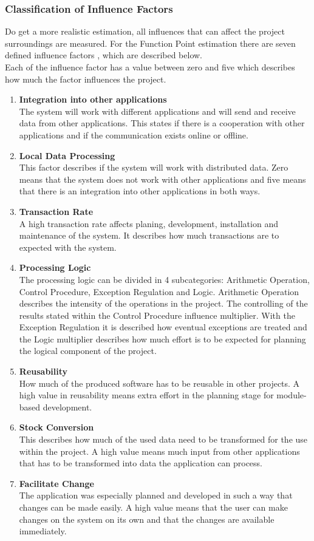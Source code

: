 \subsubsection{ Classification of Influence Factors}

Do get a more realistic estimation, all influences that can affect the project surroundings are measured. For the Function Point estimation there are seven defined influence factors \cite{Softwaremanagement}, which are described below.\\
Each of the influence factor has a value between zero and five which describes how much the factor influences the project.\\

\begin{enumerate}
	\item \textbf{Integration into other applications}\\The system will work with different applications and will send and receive data from other applications. This states if there is a cooperation with other applications and if the communication exists online or offline.
	\item \textbf{Local Data Processing}\\This factor describes if the system will work with distributed data. Zero means that the system does not work with other applications and five means that there is an integration into other applications in both ways.
	\item \textbf{Transaction Rate}\\A high transaction rate affects planing, development, installation and maintenance of the system. It describes how much transactions are to expected with the system.
	\item \textbf{Processing Logic}\\The processing logic can be divided in 4 subcategories: Arithmetic Operation, Control Procedure, Exception Regulation and Logic. Arithmetic Operation describes the intensity of the operations in the project. The controlling of the results stated within the Control Procedure influence multiplier. With the Exception Regulation it is described how eventual exceptions are treated and the Logic multiplier describes how much effort is to be expected for planning the logical component of the project.
	\item \textbf{Reusability}\\ How much of the produced software has to be reusable in other projects. A high value in reusability means extra effort in the planning stage for module-based development.
	\item \textbf{Stock Conversion}\\ This describes how much of the used data need to be transformed for the use within the project. A high value means much input from other applications that has to be transformed into data the application can process.
	\item \textbf{Facilitate Change}\\ The application was especially planned and developed in such a way that changes can be made easily. A high value means that the user can make changes on the system on its own and that the changes are available immediately.
\end{enumerate}
